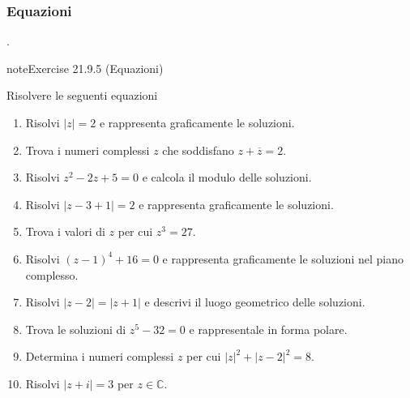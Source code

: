 \documentclass[letterpaper,10pt,italian]{jupyterBook}
\begin{document}
\subsubsection{Equazioni}
\label{\detokenize{ch/algebra/complex-algebra-problems:equazioni}}\label{\detokenize{ch/algebra/complex-algebra-problems:math-hs-algebra-complex-problems-equations-eq}}
\sphinxAtStartPar
{\hyperref[\detokenize{ch/algebra/complex-algebra-sol:math-hs-algebra-complex-sol-equations-eq-sol}]{}}.
 \label{exercise:ch/algebra/complex-algebra-problems-exercise-4}

\begin{sphinxadmonition}{note}{Exercise 21.9.5 (Equazioni)}



\sphinxAtStartPar
Risolvere le seguenti equazioni
\begin{enumerate}
%
\item {} 
\sphinxAtStartPar
Risolvi \(|z| = 2\) e rappresenta graficamente le soluzioni.

\item {} 
\sphinxAtStartPar
Trova i numeri complessi \(z\) che soddisfano \(z + \overline{z} = 2\).

\item {} 
\sphinxAtStartPar
Risolvi \(z^2 - 2z + 5 = 0\) e calcola il modulo delle soluzioni.

\item {} 
\sphinxAtStartPar
Risolvi \(|z - 3 + 1| = 2\) e rappresenta graficamente le soluzioni.

\item {} 
\sphinxAtStartPar
Trova i valori di \(z\) per cui \(z^3 = 27\).

\item {} 
\sphinxAtStartPar
Risolvi \((z-1)^4 + 16 = 0\) e rappresenta graficamente le soluzioni nel piano complesso.

\item {} 
\sphinxAtStartPar
Risolvi \(|z - 2| = |z + 1|\) e descrivi il luogo geometrico delle soluzioni.

\item {} 
\sphinxAtStartPar
Trova le soluzioni di \(z^5 - 32 = 0\) e rappresentale in forma polare.

\item {} 
\sphinxAtStartPar
Determina i numeri complessi \(z\) per cui \(|z|^2 + |z - 2|^2 = 8\).

\item {} 
\sphinxAtStartPar
Risolvi \(|z + i| = 3\) per \(z \in \mathbb{C}\).


\end{enumerate}
\end{sphinxadmonition}
\end{document}
